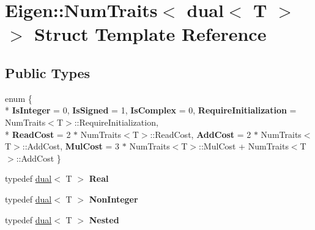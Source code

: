 \hypertarget{struct_eigen_1_1_num_traits_3_01dual_3_01_t_01_4_01_4}{\section{Eigen\-:\-:Num\-Traits$<$ dual$<$ T $>$ $>$ Struct Template Reference}
\label{struct_eigen_1_1_num_traits_3_01dual_3_01_t_01_4_01_4}
}
\subsection*{Public Types}
\begin{DoxyCompactItemize}
\item 
enum \{ \\*
{\bfseries Is\-Integer} = 0, 
{\bfseries Is\-Signed} = 1, 
{\bfseries Is\-Complex} = 0, 
{\bfseries Require\-Initialization} = Num\-Traits$<$T$>$\-:\-:Require\-Initialization, 
\\*
{\bfseries Read\-Cost} = 2 $\ast$ Num\-Traits$<$T$>$\-:\-:Read\-Cost, 
{\bfseries Add\-Cost} = 2 $\ast$ Num\-Traits$<$T$>$\-:\-:Add\-Cost, 
{\bfseries Mul\-Cost} = 3 $\ast$ Num\-Traits$<$T$>$\-:\-:Mul\-Cost + Num\-Traits$<$T$>$\-:\-:Add\-Cost
 \}
\item 
\hypertarget{struct_eigen_1_1_num_traits_3_01dual_3_01_t_01_4_01_4_a26ecaebf4644a9f1f6d85be4a2942f2f}{typedef \hyperlink{struct_d_r_d_s_p_1_1dual}{dual}$<$ T $>$ {\bfseries Real}}\label{struct_eigen_1_1_num_traits_3_01dual_3_01_t_01_4_01_4_a26ecaebf4644a9f1f6d85be4a2942f2f}

\item 
\hypertarget{struct_eigen_1_1_num_traits_3_01dual_3_01_t_01_4_01_4_aeac6a4fe1a0dfd09a45b1f91c9b238b1}{typedef \hyperlink{struct_d_r_d_s_p_1_1dual}{dual}$<$ T $>$ {\bfseries Non\-Integer}}\label{struct_eigen_1_1_num_traits_3_01dual_3_01_t_01_4_01_4_aeac6a4fe1a0dfd09a45b1f91c9b238b1}

\item 
\hypertarget{struct_eigen_1_1_num_traits_3_01dual_3_01_t_01_4_01_4_a7567273cf33aec5adf9c0ebf97e0de60}{typedef \hyperlink{struct_d_r_d_s_p_1_1dual}{dual}$<$ T $>$ {\bfseries Nested}}\label{struct_eigen_1_1_num_traits_3_01dual_3_01_t_01_4_01_4_a7567273cf33aec5adf9c0ebf97e0de60}

\end{DoxyCompactItemize}
